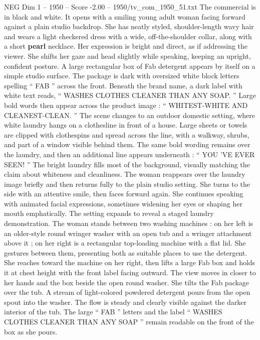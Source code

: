 \begin{textsample}{NEG Dim 1 – 1950 – Score -2.00 – 1950/tv\_com\_1950\_51.txt}  \label{ex:f1_neg_015}
The commercial is in black and white.
It opens with a smiling young adult woman facing forward against a plain studio backdrop.
She has neatly styled, shoulder-length wavy hair and wears a light checkered dress with a wide, off-the-shoulder collar, along with a short \textbf{pearl} necklace.
Her expression is bright and direct, as if addressing the viewer.
She shifts her gaze and head slightly while speaking, keeping an upright, confident posture.
A large rectangular box of Fab detergent appears by itself on a simple studio surface.
The package is dark with oversized white block letters spelling “ FAB ” across the front.
Beneath the brand name, a dark label with white text reads, “ WASHES CLOTHES CLEANER THAN ANY SOAP. ” Large bold words then appear across the product image : “ WHITEST-WHITE AND CLEANEST-CLEAN. ” The scene changes to an outdoor domestic setting, where white laundry hangs on a clothesline in front of a house.
Large sheets or towels are clipped with clothespins and spread across the line, with a walkway, shrubs, and part of a window visible behind them.
The same bold wording remains over the laundry, and then an additional line appears underneath : “ YOU ’VE EVER SEEN! ” The bright laundry fills most of the background, visually matching the claim about whiteness and cleanliness.
The woman reappears over the laundry image briefly and then returns fully to the plain studio setting.
She turns to the side with an attentive smile, then faces forward again.
She continues speaking with animated facial expressions, sometimes widening her eyes or shaping her mouth emphatically.
The setting expands to reveal a staged laundry demonstration.
The woman stands between two washing machines : on her left is an older-style round wringer washer with an open tub and a wringer attachment above it ; on her right is a rectangular top-loading machine with a flat lid.
She gestures between them, presenting both as suitable places to use the detergent.
She reaches toward the machine on her right, then lifts a large Fab box and holds it at chest height with the front label facing outward.
The view moves in closer to her hands and the box beside the open round washer.
She tilts the Fab package over the tub.
A stream of light-colored powdered detergent pours from the open spout into the washer.
The flow is steady and clearly visible against the darker interior of the tub.
The large “ FAB ” letters and the label “ WASHES CLOTHES CLEANER THAN ANY SOAP ” remain readable on the front of the box as she pours.

\end{textsample}
